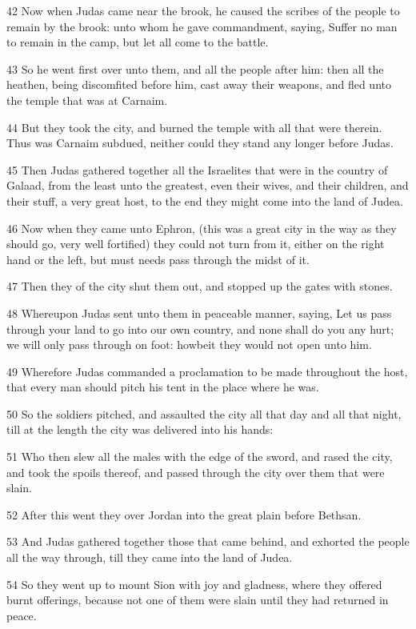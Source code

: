 \par 42 Now when Judas came near the brook, he caused the scribes of the people to remain by the brook: unto whom he gave commandment, saying, Suffer no man to remain in the camp, but let all come to the battle.
\par 43 So he went first over unto them, and all the people after him: then all the heathen, being discomfited before him, cast away their weapons, and fled unto the temple that was at Carnaim.
\par 44 But they took the city, and burned the temple with all that were therein. Thus was Carnaim subdued, neither could they stand any longer before Judas.
\par 45 Then Judas gathered together all the Israelites that were in the country of Galaad, from the least unto the greatest, even their wives, and their children, and their stuff, a very great host, to the end they might come into the land of Judea.
\par 46 Now when they came unto Ephron, (this was a great city in the way as they should go, very well fortified) they could not turn from it, either on the right hand or the left, but must needs pass through the midst of it.
\par 47 Then they of the city shut them out, and stopped up the gates with stones.
\par 48 Whereupon Judas sent unto them in peaceable manner, saying, Let us pass through your land to go into our own country, and none shall do you any hurt; we will only pass through on foot: howbeit they would not open unto him.
\par 49 Wherefore Judas commanded a proclamation to be made throughout the host, that every man should pitch his tent in the place where he was.
\par 50 So the soldiers pitched, and assaulted the city all that day and all that night, till at the length the city was delivered into his hands:
\par 51 Who then slew all the males with the edge of the sword, and rased the city, and took the spoils thereof, and passed through the city over them that were slain.
\par 52 After this went they over Jordan into the great plain before Bethsan.
\par 53 And Judas gathered together those that came behind, and exhorted the people all the way through, till they came into the land of Judea.
\par 54 So they went up to mount Sion with joy and gladness, where they offered burnt offerings, because not one of them were slain until they had returned in peace.
